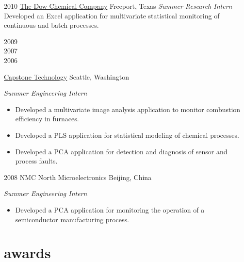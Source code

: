 \documentclass[]{../friggeri-cv} %
\begin{document}
\begin{entrylist}

\entry
{2010}
{\href{http://www.dow.com/}{The Dow Chemical Company}}
{Freeport, Texas}
{\emph{Summer Research Intern} \\
Developed an Excel application for multivariate statistical monitoring of continuous and batch processes.}


\entry
{\begin{minipage}[t]{2cm}2009 \\ 2007 \\ 2006\end{minipage}}
{\href{http://www.capstonetechnology.com}{Capstone Technology}}
{Seattle, Washington}
{\emph{Summer Engineering Intern}
\begin{itemize}
	\item Developed a multivariate image analysis application to monitor combustion efficiency in furnaces.
	\item Developed a PLS application for statistical modeling of chemical processes.
	\item Developed a PCA application for detection and diagnosis of sensor and process faults.
\end{itemize}}


\entry
{2008}
{NMC North Microelectronics}
{Beijing, China}
{\emph{Summer Engineering Intern}
\begin{itemize}
	\item Developed a PCA application for monitoring the operation of a semiconductor manufacturing process.
\end{itemize}}





\end{entrylist}


\section{awards}
\end{document}
